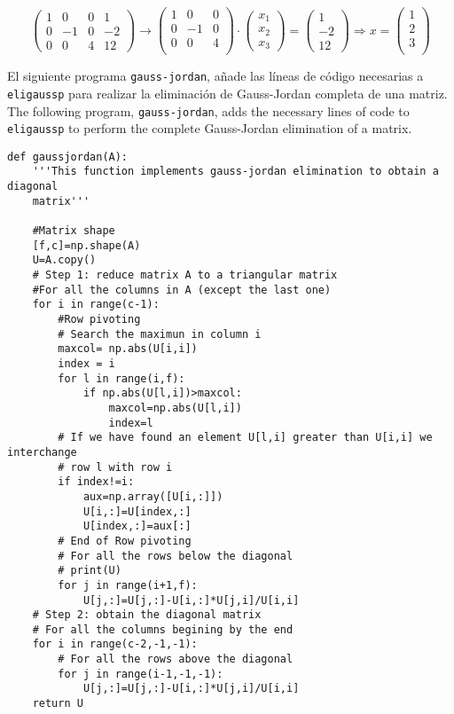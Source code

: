 \begin{equation*}
\begin{pmatrix}
1&     0&     0&    1\\
 0&    -1&    0&    -2\\
 0&     0&     4&    12
\end{pmatrix} \rightarrow \begin{pmatrix}
1&     0&     0\\
 0&    -1&    0\\
 0&     0&     4\\
\end{pmatrix}\cdot\begin{pmatrix}
x_1\\
x_2\\
x_3
\end{pmatrix}=\begin{pmatrix}
1\\
-2\\
12
\end{pmatrix} \Rightarrow x=\begin{pmatrix}
1\\
2\\
3\\
\end{pmatrix}
\end{equation*}

\begin{paracol}{2}
El siguiente programa \texttt{gauss-jordan}, añade las líneas de código necesarias a \texttt{eligaussp} para realizar la eliminación de Gauss-Jordan completa de una matriz.
\switchcolumn
The following program, \texttt{gauss-jordan}, adds the necessary lines of code to \texttt{eligaussp} to perform the complete Gauss-Jordan elimination of a matrix.
\end{paracol}

\begin{verbatim}
def gaussjordan(A):
    '''This function implements gauss-jordan elimination to obtain a diagonal
    matrix'''    
    
    #Matrix shape
    [f,c]=np.shape(A)
    U=A.copy()
    # Step 1: reduce matrix A to a triangular matrix
    #For all the columns in A (except the last one)
    for i in range(c-1):
        #Row pivoting
        # Search the maximun in column i
        maxcol= np.abs(U[i,i])
        index = i
        for l in range(i,f):
            if np.abs(U[l,i])>maxcol:
                maxcol=np.abs(U[l,i])
                index=l
        # If we have found an element U[l,i] greater than U[i,i] we interchange
        # row l with row i
        if index!=i:
            aux=np.array([U[i,:]])
            U[i,:]=U[index,:]
            U[index,:]=aux[:]
        # End of Row pivoting
        # For all the rows below the diagonal
        # print(U)
        for j in range(i+1,f):
            U[j,:]=U[j,:]-U[i,:]*U[j,i]/U[i,i]
    # Step 2: obtain the diagonal matrix
    # For all the columns begining by the end
    for i in range(c-2,-1,-1):
        # For all the rows above the diagonal
        for j in range(i-1,-1,-1):
            U[j,:]=U[j,:]-U[i,:]*U[j,i]/U[i,i]
    return U
    
\end{verbatim}

